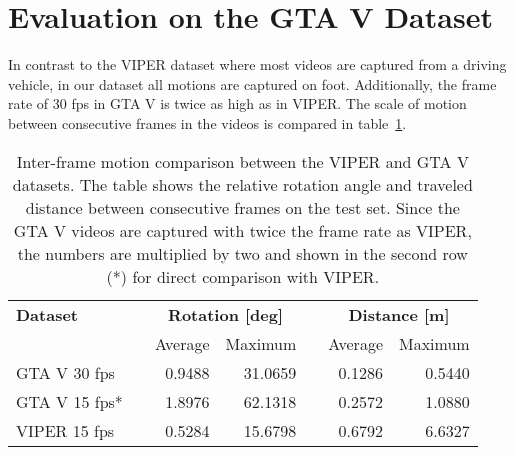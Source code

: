 	\section{Evaluation on the GTA V Dataset}
		In contrast to the VIPER dataset where most videos are captured from a driving vehicle, in our dataset all motions are captured on foot.
		Additionally, the frame rate of 30 fps in GTA V is twice as high as in VIPER.
		The scale of motion between consecutive frames in the videos is compared in table~\ref{tbl:viper-gta-comparison-inter-frame-motion}.
		\begin{table}[tb]
			\small
			\begin{center}
				\begin{tabular}{lcrrcrr}
					\toprule
					\textbf{Dataset} 		& 	& \multicolumn{2}{c}{\textbf{Rotation [deg]}} 		& & \multicolumn{2}{c}{\textbf{Distance [m]}} 		\\
									& 	& Average 		& Maximum			&	& Average 		& Maximum					\\
					\midrule
					GTA V 30 fps 	& 	&  0.9488	& 31.0659 		&	& 0.1286 	& 0.5440 				\\
					GTA V 15 fps*	& 	&  1.8976	& 62.1318		& 	& 0.2572	& 1.0880				\\
					VIPER 15 fps	&   & 0.5284	& 15.6798 		& 	& 0.6792	& 6.6327				\\
					\bottomrule
				\end{tabular}
			\end{center}
			\caption[Inter-frame motion comparison between the VIPER and GTA V datasets]
					{Inter-frame motion comparison between the VIPER and GTA V datasets.
					 The table shows the relative rotation angle and traveled distance between consecutive frames on the test set.
					 Since the GTA V videos are captured with twice the frame rate as VIPER, the numbers are multiplied by two and shown in the second row (*) for direct comparison with VIPER. 
					 \label{tbl:viper-gta-comparison-inter-frame-motion}}
			
		\end{table}
